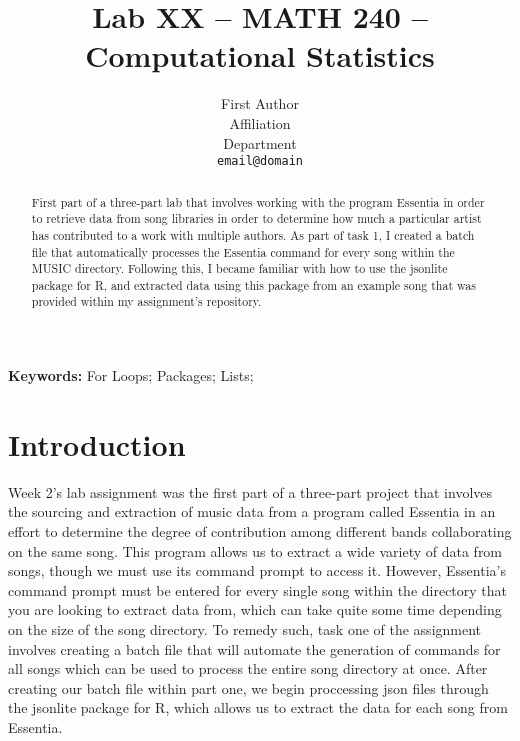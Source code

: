 \documentclass{article}\usepackage[]{graphicx}\usepackage[]{xcolor}
\begin{document}
\vspace{-1in}
\title{Lab XX -- MATH 240 -- Computational Statistics}

\author{
  First Author \\
  Affiliation  \\
  Department  \\
  {\tt email@domain}
}

\date{}

\maketitle

\begin{multicols}{2}
\begin{abstract}
First part of a three-part lab that involves working with the program Essentia in order to retrieve data from song libraries in order to determine how much a particular artist has contributed to a work with multiple authors. As part of task 1, I created a batch file that automatically processes the Essentia command for every song within the MUSIC directory. Following this, I became familiar with how to use the jsonlite package for R, and extracted data using this package from an example song that was provided within my assignment's repository.
\end{abstract}

\noindent \textbf{Keywords:} For Loops; Packages; Lists;

\section{Introduction}
Week 2's lab assignment was the first part of a three-part project that involves the sourcing and extraction of music data from a program called Essentia in an effort to determine the degree of contribution among different bands collaborating on the same song.  This program allows us to extract a wide variety of data from songs, though we must use its command prompt   to access it. However, Essentia's command prompt must be entered for every single song within the directory that you are looking to extract data from, which can take quite some time depending on the size of the song directory. To remedy such, task one of the assignment involves creating a batch file that will automate the generation of commands for all songs which can be used to process the entire song directory at once. After creating our batch file within part one, we begin proccessing json files through the jsonlite package for R, which allows us to extract the data for each song from Essentia.





\end{multicols}
\end{document}
